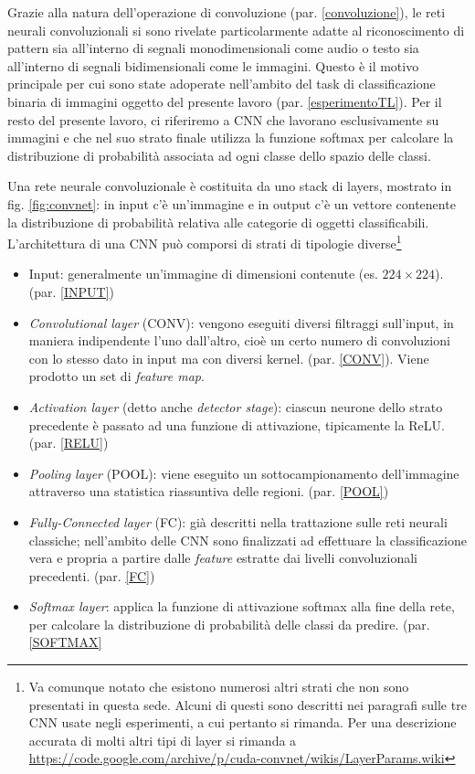 Grazie alla natura dell'operazione di convoluzione (par. \ref{convoluzione}), le reti neurali convoluzionali si sono rivelate particolarmente adatte al riconoscimento di pattern sia all'interno di segnali monodimensionali come audio o testo sia all'interno di segnali bidimensionali come le immagini. Questo è il motivo principale per cui sono state adoperate nell'ambito del task di classificazione binaria di immagini oggetto del presente lavoro (par. \ref{esperimentoTL}).
Per il resto del presente lavoro, ci riferiremo a CNN che lavorano esclusivamente su immagini e che nel suo strato finale utilizza la funzione softmax per calcolare la distribuzione di probabilità associata ad ogni classe dello spazio delle classi.

Una rete neurale convoluzionale è costituita da uno stack di layers, mostrato in fig. \ref{fig:convnet}: in input c'è un'immagine e in output c'è un vettore contenente la distribuzione di probabilità relativa alle categorie di oggetti classificabili.\\

L'architettura di una CNN può comporsi di strati di tipologie diverse\footnote{Va comunque notato che esistono numerosi altri strati che non sono presentati in questa sede. Alcuni di questi sono descritti nei paragrafi sulle tre CNN usate negli esperimenti, a cui pertanto si rimanda. Per una descrizione accurata di molti altri tipi di layer si rimanda a \url{https://code.google.com/archive/p/cuda-convnet/wikis/LayerParams.wiki}}

\begin{itemize}
	\item Input: generalmente un'immagine di dimensioni contenute (es. $224\times 224$). (par. \ref{INPUT})
	\item \textit{Convolutional layer} (CONV): vengono eseguiti diversi filtraggi sull'input, in maniera indipendente l'uno dall'altro, cioè un certo numero di convoluzioni con lo stesso dato in input ma con diversi kernel. (par. \ref{CONV}). Viene prodotto un set di \textit{feature map}.
	\item \textit{Activation layer} (detto anche \textit{ detector stage}): ciascun neurone dello strato precedente è passato ad una funzione di attivazione, tipicamente la ReLU. (par. \ref{RELU})
	\item \textit{Pooling layer} (POOL): viene eseguito un sottocampionamento dell'immagine attraverso una statistica riassuntiva delle regioni. (par. \ref{POOL})
	\item \textit{Fully-Connected layer} (FC): già descritti nella trattazione sulle reti neurali classiche; nell'ambito delle CNN sono finalizzati ad effettuare la classificazione vera e propria a partire dalle \textit{feature} estratte dai livelli convoluzionali precedenti. (par. \ref{FC})
	\item \textit{Softmax layer}: applica la funzione di attivazione softmax alla fine della rete, per calcolare la distribuzione di probabilità delle classi da predire. (par. \ref{SOFTMAX}
\end{itemize}

